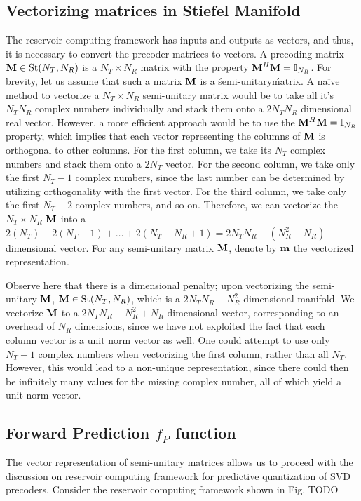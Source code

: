 \documentclass[conference]{IEEEtran}
\begin{document}
\subsection{Vectorizing matrices in Stiefel Manifold}
The reservoir computing framework has inputs and outputs as vectors, and thus, it is necessary to convert the precoder matrices to vectors.
A precoding matrix $\mathcal{{\bf M}} \in \text{St}(N_T,N_R)$ is a $N_T\times N_R$ matrix with the property $\mathcal{{\bf M}}^H\mathcal{{\bf M}}=\mathbb{I}_{N_R}$.
For brevity, let us assume that such a matrix $\mathcal{{\bf M}}$ is a \'semi-unitary\' matrix.
A na{\"i}ve method to vectorize a $N_T\times N_R$ semi-unitary matrix would be to take all it's $N_TN_R$ complex numbers individually and stack them onto a $2N_TN_R$ dimensional real vector.
However, a more efficient approach would be to use the $\mathcal{{\bf M}}^H\mathcal{{\bf M}}=\mathbb{I}_{N_R}$ property, which implies that each vector representing the columns of $\mathcal{{\bf M}}$ is orthogonal to other columns.
For the first column, we take its $N_T$ complex numbers and stack them onto a $2N_T$ vector.
For the second column, we take only the first $N_T-1$ complex numbers, since the last number can be determined by utilizing orthogonality with the first vector.
For the third column, we take only the first $N_T-2$ complex numbers, and so on.
Therefore, we can vectorize the $N_T\times N_R$ $\mathcal{{\bf M}}$ into a $2(N_T)+2(N_T-1)+\ldots+2(N_T-N_R+1)= 2N_TN_R-(N_R^2-N_R)$ dimensional vector.
For any semi-unitary matrix $\mathcal{{\bf M}}$, denote by $\mathcal{{\bf m}}$ the vectorized representation.

Observe here that there is a dimensional penalty; upon vectorizing the semi-unitary $\mathcal{{\bf M}}$,
$\mathcal{{\bf M}} \in \text{St}(N_T,N_R)$, which is a $2N_TN_R-N_R^2$ dimensional manifold.
We vectorize $\mathcal{{\bf M}}$ to a $2N_TN_R-N_R^2+N_R$ dimensional vector, corresponding to an overhead of $N_R$ dimensions, since we have not exploited the fact that each column vector is a unit norm vector as well.
One could attempt to use only $N_T-1$ complex numbers when vectorizing the first column, rather than all $N_T$.
However, this would lead to a non-unique representation, since there could then be infinitely many values for the missing complex number, all of which yield a unit norm vector.
\subsection{Forward Prediction $f_P$ function}
The vector representation of semi-unitary matrices allows us to proceed with the discussion on reservoir computing framework for predictive quantization of SVD precoders.
Consider the reservoir computing framework shown in Fig. TODO %
\end{document}
